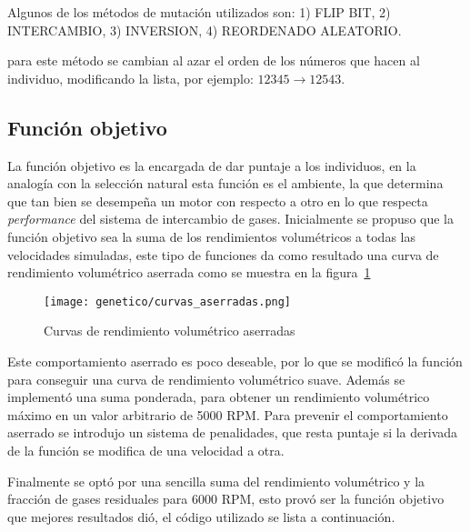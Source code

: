 Algunos de los métodos de mutación utilizados son: 1) FLIP BIT, 2) INTERCAMBIO,
3) INVERSION, 4) REORDENADO ALEATORIO.


para este método se cambian al azar el orden de los números que hacen al
individuo, modificando la lista, por ejemplo: $12345 \rightarrow 12543$.

\subsection{Función objetivo}\label{sec:funcion_objetivo}
%
La función objetivo es la encargada de dar puntaje a los individuos, en la
analogía con la selección natural esta función es el ambiente, la que determina
que tan bien se desempeña un motor con respecto a otro en lo que respecta
\emph{performance} del sistema de intercambio de gases.
%
Inicialmente se propuso que la función objetivo sea la suma de los rendimientos
volumétricos a todas las velocidades simuladas, este tipo de funciones da como
resultado una curva de rendimiento volumétrico aserrada como se muestra en la
figura~\ref{fig:curva_aserrada}

\begin{figure}[ht]
  \centering
  \texttt{[image: genetico/curvas\_aserradas.png]}
  \caption{Curvas de rendimiento volumétrico aserradas}\label{fig:curva_aserrada}
\end{figure}


Este comportamiento aserrado es poco deseable, por lo que se modificó la
función para conseguir una curva de rendimiento volumétrico suave.
%
Además se implementó una suma ponderada, para obtener un rendimiento
volumétrico máximo en un valor arbitrario de 5000 RPM.\@
%
Para prevenir el comportamiento aserrado se introdujo un sistema de penalidades,
que resta puntaje si la derivada de la función se modifica de una velocidad a
otra.

Finalmente se optó por una sencilla suma del rendimiento volumétrico y la
fracción de gases residuales para 6000 RPM, esto provó ser la función objetivo
que mejores resultados dió, el código utilizado se lista a continuación.


